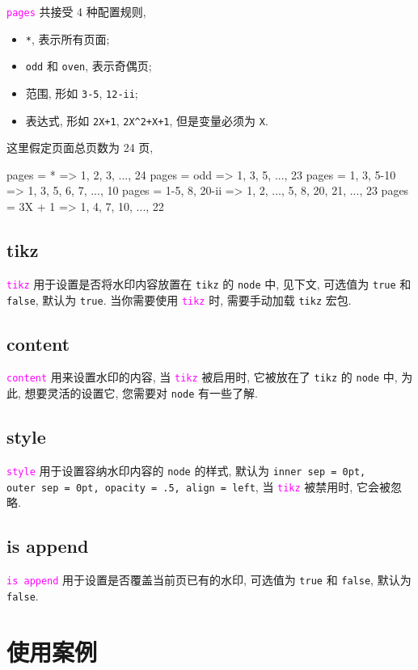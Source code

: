 \documentclass{article}
\newcounter{example}
\def\opt#1{\textcolor{magenta}{\texttt{#1}}}
\def\para#1{\textcolor[rgb]{0.13, 0.67, 0.8}{\texttt{#1}}}
\begin{document}
\opt{pages} 共接受 4 种配置规则, 
\begin{itemize}
  \item \para{*}, 表示所有页面;
  \item \para{odd} 和 \para{oven}, 表示奇偶页;
  \item 范围, 形如 \para{3-5}, \para{12-ii};
  \item 表达式, 形如 \para{2X+1}, \para{2X\^{}2+X+1}, 但是变量必须为 \para{X}.
\end{itemize}

这里假定页面总页数为 24 页, 
\begin{example}[title = pages 配置规则]
pages = {*}              =>     1, 2, 3, ..., 24
pages = {odd}            =>     1, 3, 5, ..., 23
pages = {1, 3, 5-10}     =>     1, 3, 5, 6, 7, ..., 10
pages = {1-5, 8, 20-ii}  =>     1, 2, ..., 5, 8, 20, 21, ..., 23
pages = {3X + 1}         =>     1, 4, 7, 10, ..., 22
\end{example}

\subsection{tikz}
\opt{tikz} 用于设置是否将水印内容放置在  \texttt{tikz} 的 \texttt{node} 中, 见下文, 可选值为 \para{true} 和 \para{false}, 默认为 \para{true}. 当你需要使用 \opt{tikz} 时, 需要手动加载 \texttt{tikz} 宏包.

\subsection{content}
\opt{content} 用来设置水印的内容, 当 \opt{tikz} 被启用时, 它被放在了 \texttt{tikz} 的 \texttt{node} 中, 为此, 想要灵活的设置它, 您需要对 \texttt{node} 有一些了解.

\subsection{style}
\opt{style} 用于设置容纳水印内容的 \texttt{node} 的样式, 默认为 \para{inner~sep = 0pt, outer~sep = 0pt, opacity = .5, align = left}, 当 \opt{tikz} 被禁用时, 它会被忽略.

\subsection{is append}
\opt{is append} 用于设置是否覆盖当前页已有的水印, 可选值为 \para{true} 和 \para{false}, 默认为 \para{false}.

\section{使用案例}
\begin{example}[title = 为所有页面右上角添加页码]
\end{example}
\end{document}
